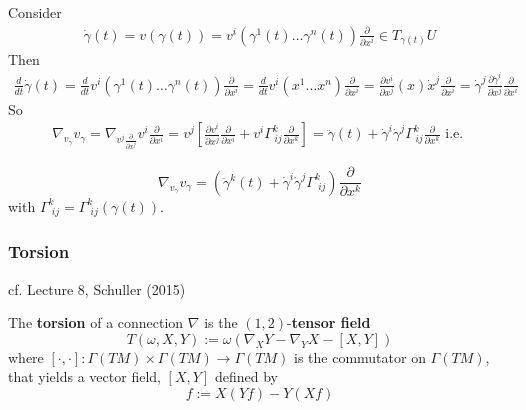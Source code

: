 Consider 
\[
\begin{gathered}
	\dot{\gamma}(t) = v(\gamma(t)) = v^i(\gamma^1(t) \dots \gamma^n(t)) \frac{\partial}{\partial x^i} \in T_{\gamma(t)} U
\end{gathered}\]
Then
\[
\begin{gathered}
	\frac{d}{dt}\dot{\gamma}(t) = \frac{d}{dt} v^i(\gamma^1(t) \dots \gamma^n(t)) \frac{\partial}{\partial x^i} = \frac{d}{dt} v^i(x^1 \dots x^n ) \frac{\partial}{\partial x^i} = \frac{\partial v^i}{\partial x^j}(x) \dot{x}^j \frac{\partial}{\partial x^i} = \dot{\gamma}^j \frac{\partial \dot{\gamma}^i}{\partial x^j} \frac{\partial }{ \partial x^i}
\end{gathered}\]
So
\[
\begin{gathered}
	\nabla_{v_{\gamma}} v_{\gamma} = \nabla_{v^j \frac{\partial}{\partial x^j} } v^i \frac{\partial}{\partial x^i} = v^j \left[ \frac{\partial v^i}{\partial x^j} \frac{\partial}{\partial x^i} + v^i \Gamma^k_{\, ij} \frac{\partial }{\partial x^k} \right] = \ddot{\gamma}(t) + \dot{\gamma}^i \dot{\gamma}^j \Gamma^k_{\, ij} \frac{\partial}{\partial x^k} \text{ i.e. }
\end{gathered}\]

\begin{equation}
	\boxed{ \nabla_{v_{\gamma}} v_{\gamma} = \left( \ddot{\gamma}^k(t) + \dot{\gamma}^i \dot{\gamma}^j \Gamma^k_{\, \, ij} \right) \frac{\partial }{ \partial x^k}  }
\end{equation}
with $\Gamma^k_{\, \, ij} = \Gamma^k_{\, \, ij}(\gamma(t))$.

\subsubsection{Torsion}
cf. Lecture 8, Schuller (2015) \cite{dgdt:Schul2015}

\begin{definition}[torsion]
	The \textbf{torsion} of a connection $\nabla$ is the $(1,2)$-\textbf{tensor field}
	\begin{equation}
		T(\omega,X,Y) := \omega( \nabla_X Y - \nabla_Y X - [X,Y])
	\end{equation}
where $[\cdot, \cdot] : \Gamma(TM) \times \Gamma(TM) \to \Gamma(TM)$ is the commutator on $\Gamma(TM)$, that yields a vector field, $[X, Y]$ defined by
\begin{equation}
	[X,Y]f:= X(Yf) - Y(Xf)
\end{equation}
\end{definition}


